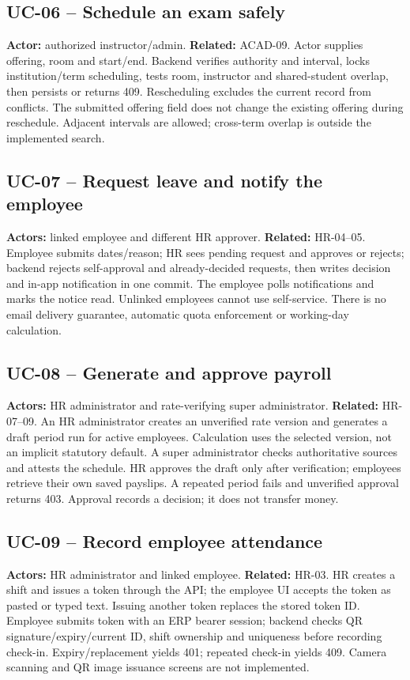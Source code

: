 \documentclass[10pt,a4paper]{article}
\begin{document}
\subsection{UC-06 -- Schedule an exam safely}
\textbf{Actor:} authorized instructor/admin. \textbf{Related:} ACAD-09.
Actor supplies offering, room and start/end. Backend verifies authority and interval,
locks institution/term scheduling, tests room, instructor and shared-student overlap,
then persists or returns 409. Rescheduling excludes the current record from conflicts.
The submitted offering field does not change the existing offering during reschedule.
Adjacent intervals are allowed; cross-term overlap is outside the implemented search.

\subsection{UC-07 -- Request leave and notify the employee}
\textbf{Actors:} linked employee and different HR approver. \textbf{Related:} HR-04--05.
Employee submits dates/reason; HR sees pending request and approves or rejects;
backend rejects self-approval and already-decided requests, then writes decision
and in-app notification in one commit. The employee polls notifications and marks
the notice read. Unlinked employees cannot use self-service. There is no email
delivery guarantee, automatic quota enforcement or working-day calculation.

\subsection{UC-08 -- Generate and approve payroll}
\textbf{Actors:} HR administrator and rate-verifying super administrator.
\textbf{Related:} HR-07--09.
An HR administrator creates an unverified rate version and generates a draft
period run for active employees. Calculation uses the selected version, not an
implicit statutory default. A super administrator checks authoritative sources
and attests the schedule. HR approves the draft only after verification; employees
retrieve their own saved payslips. A repeated period fails and unverified approval
returns 403. Approval records a decision; it does not transfer money.

\subsection{UC-09 -- Record employee attendance}
\textbf{Actors:} HR administrator and linked employee. \textbf{Related:} HR-03.
HR creates a shift and issues a token through the API; the employee UI accepts the
token as pasted or typed text.
Issuing another token replaces the stored token ID. Employee submits token with
an ERP bearer session; backend checks QR signature/expiry/current ID, shift ownership
and uniqueness before recording check-in. Expiry/replacement yields 401; repeated
check-in yields 409. Camera scanning and QR image issuance screens are not implemented.
\end{document}
